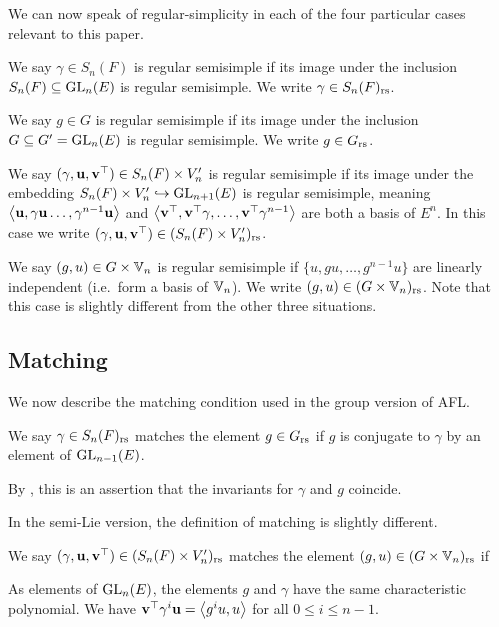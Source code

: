We can now speak of regular-simplicity in each of the four
particular cases relevant to this paper.
\begin{definition}
  \begin{itemize}
    \ii We say $\gamma \in S_n(F)$ is regular semisimple
    if its image under the inclusion $S_n(F) \subseteq \operatorname{GL}_n(E)$ is regular semisimple.
    We write $\gamma \in S_n(F)_{\mathrm{rs}}$.

    \ii We say $g \in G$ is regular semisimple
    if its image under the inclusion $G \subseteq G' = \operatorname{GL}_n(E)$ is regular semisimple.
    We write $g \in G_{\mathrm{rs}}$.

    \ii We say $(\gamma, \mathbf u, \mathbf v^\top) \in S_n(F) \times V_n'$
    is regular semisimple if its image under
    the embedding $S_n(F) \times V_n' \hookrightarrow \operatorname{GL}_{n+1}(E)$
    is regular semisimple, meaning $\left< \mathbf u, \gamma \mathbf u \dots, \gamma^{n-1}\mathbf u \right>$
    and $\left< \mathbf v^\top, \mathbf v^\top \gamma, \dots, \mathbf v^\top \gamma^{n-1} \right>$
    are both a basis of $E^n$.
    In this case we write $(\gamma, \mathbf u, \mathbf v^\top) \in (S_n(F) \times V_n')_{\mathrm{rs}}$.

    \ii We say $(g, u) \in G \times \mathbb V_n$
    is regular semisimple if $\{u, gu, \dots, g^{n-1}u\}$ are linearly independent
    (i.e.\ form a basis of $\mathbb V_n$).
    We write $(g,u) \in (G \times \mathbb V_n)_{\mathrm{rs}}$.
    Note that this case is slightly different from the other three situations.
  \end{itemize}
  \label{def:regular}
\end{definition}

\subsection{Matching}
We now describe the matching condition used in the group version of AFL.
\begin{definition}
  We say $\gamma \in S_n(F)_{\mathrm{rs}}$ matches the element $g \in G_{\mathrm{rs}}$ if
  $g$ is conjugate to $\gamma$ by an element of $\operatorname{GL}_{n-1}(E)$.
\end{definition}
By , this is an assertion that
the invariants for $\gamma$ and $g$ coincide.

In the semi-Lie version, the definition of matching is slightly different.
\begin{definition}
  We say $(\gamma, \mathbf u, \mathbf v^\top) \in (S_n(F) \times V_n')_{\mathrm{rs}}$
  matches the element $(g, u) \in (G \times \mathbb V_n)_{\mathrm{rs}}$ if
  \begin{itemize}
    \ii As elements of $\operatorname{GL}_n(E)$,
    the elements $g$ and $\gamma$ have the same characteristic polynomial.
    \ii We have $\mathbf v^\top \gamma^i \mathbf u = \left< g^i u, u \right>$ for all $0 \le i \le n-1$.
  \end{itemize}
\end{definition}
